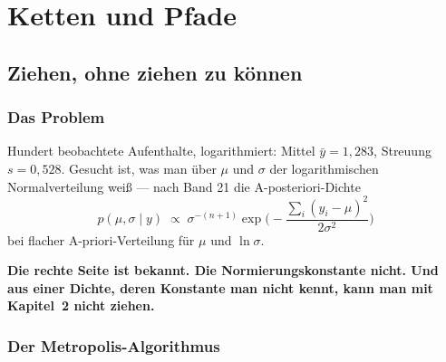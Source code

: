 \part{Ketten und Pfade}

\chapter{Ziehen, ohne ziehen zu können}

\section{Das Problem}

\begin{merksatz}
Hundert beobachtete Aufenthalte, logarithmiert: Mittel $\bar y = 1{,}283$, Streuung $s = 0{,}528$. Gesucht ist, was man über $\mu$ und $\sigma$ der logarithmischen Normalverteilung weiß --- nach Band 21 die A-posteriori-Dichte
\[ p(\mu,\sigma\mid y) \;\propto\; \sigma^{-(n+1)} \exp\!\Big(-\frac{\sum_i (y_i-\mu)^2}{2\sigma^2}\Big) \]
bei flacher A-priori-Verteilung für $\mu$ und $\ln\sigma$.

\begin{center}
\begin{minipage}{0.9\textwidth}
\textbf{Die rechte Seite ist bekannt. Die Normierungskonstante nicht. Und aus einer Dichte, deren Konstante man nicht kennt, kann man mit Kapitel~2 nicht ziehen.}
\end{minipage}
\end{center}

\begin{center}
\begin{minipage}{0.88\textwidth}
\end{minipage}
\end{center}
\end{merksatz}

\section{Der Metropolis-Algorithmus}

